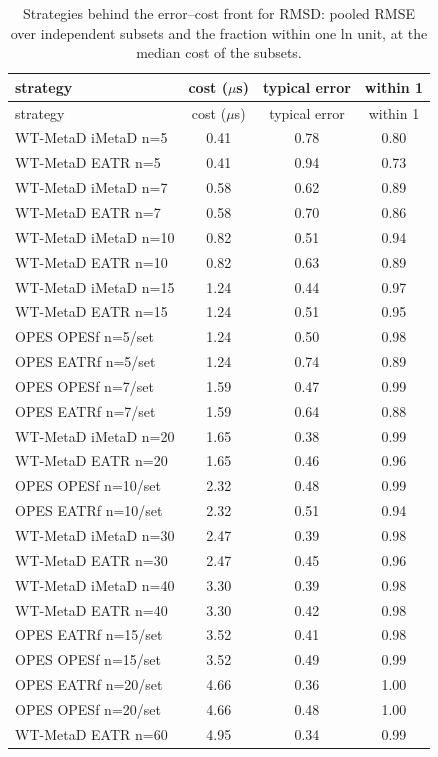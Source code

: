 \begin{longtable}{lccc}
\caption{Strategies behind the error--cost front for RMSD: pooled RMSE over independent subsets and the fraction within one ln unit, at the median cost of the subsets.}\label{tab:s10RMSD}\\
\toprule
strategy & cost ($\mu$s) & typical error & within 1\\ \midrule
\endfirsthead
\toprule
strategy & cost ($\mu$s) & typical error & within 1\\ \midrule
\endhead
\bottomrule
\endfoot
WT-MetaD iMetaD n=5 & 0.41 & 0.78 & 0.80 \\
WT-MetaD EATR n=5 & 0.41 & 0.94 & 0.73 \\
WT-MetaD iMetaD n=7 & 0.58 & 0.62 & 0.89 \\
WT-MetaD EATR n=7 & 0.58 & 0.70 & 0.86 \\
WT-MetaD iMetaD n=10 & 0.82 & 0.51 & 0.94 \\
WT-MetaD EATR n=10 & 0.82 & 0.63 & 0.89 \\
WT-MetaD iMetaD n=15 & 1.24 & 0.44 & 0.97 \\
WT-MetaD EATR n=15 & 1.24 & 0.51 & 0.95 \\
OPES OPESf n=5/set & 1.24 & 0.50 & 0.98 \\
OPES EATRf n=5/set & 1.24 & 0.74 & 0.89 \\
OPES OPESf n=7/set & 1.59 & 0.47 & 0.99 \\
OPES EATRf n=7/set & 1.59 & 0.64 & 0.88 \\
WT-MetaD iMetaD n=20 & 1.65 & 0.38 & 0.99 \\
WT-MetaD EATR n=20 & 1.65 & 0.46 & 0.96 \\
OPES OPESf n=10/set & 2.32 & 0.48 & 0.99 \\
OPES EATRf n=10/set & 2.32 & 0.51 & 0.94 \\
WT-MetaD iMetaD n=30 & 2.47 & 0.39 & 0.98 \\
WT-MetaD EATR n=30 & 2.47 & 0.45 & 0.96 \\
WT-MetaD iMetaD n=40 & 3.30 & 0.39 & 0.98 \\
WT-MetaD EATR n=40 & 3.30 & 0.42 & 0.98 \\
OPES EATRf n=15/set & 3.52 & 0.41 & 0.98 \\
OPES OPESf n=15/set & 3.52 & 0.49 & 0.99 \\
OPES EATRf n=20/set & 4.66 & 0.36 & 1.00 \\
OPES OPESf n=20/set & 4.66 & 0.48 & 1.00 \\
WT-MetaD EATR n=60 & 4.95 & 0.34 & 0.99 \\

\end{longtable}
